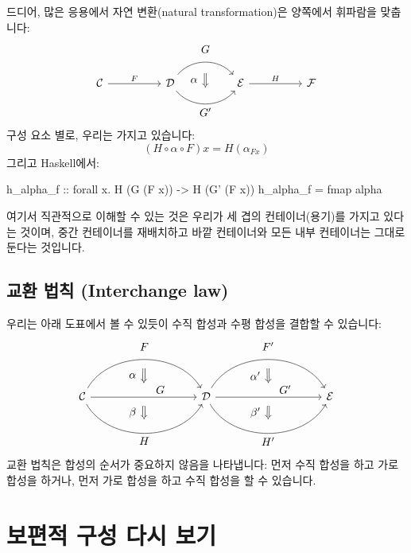 \documentclass[DaoFP]{subfiles}
\begin{document}
드디어, 많은 응용에서 자연 변환(natural transformation)은 양쪽에서 휘파람을 맞춥니다:
\[
\begin{tikzcd}[column sep=huge]
\mathcal{C}
 \arrow[r, "F"]
 &
\mathcal{D}
  \arrow[bend left=50]{r}[name=U1, label=above:$G$]{}
  \arrow[bend right=50]{r}[name=D1, label=below:$G'$]{} 
 &
\mathcal{E}
  \arrow[shorten <=10pt,shorten >=10pt,Rightarrow,to path={(U1) -- node[label=left:$\alpha$] {} (D1)}]{}
  \arrow[r, "H"]
 &
 \mathcal{F}
\end{tikzcd}
\]
구성 요소 별로, 우리는 가지고 있습니다:
\[ (H \circ \alpha \circ F) x = H (\alpha_{F x})\]
그리고 Haskell에서:
\begin{haskell}
h_alpha_f :: forall x. H (G (F x)) -> H (G' (F x))
h_alpha_f = fmap alpha
\end{haskell}

여기서 직관적으로 이해할 수 있는 것은 우리가 세 겹의 컨테이너(용기)를 가지고 있다는 것이며, 중간 컨테이너를 재배치하고 바깥 컨테이너와 모든 내부 컨테이너는 그대로 둔다는 것입니다.

\subsection{교환 법칙 (Interchange law)}

우리는 아래 도표에서 볼 수 있듯이 수직 합성과 수평 합성을 결합할 수 있습니다:
\[
\begin{tikzcd}[column sep=huge]
\mathcal{C}
  \arrow[bend left=60]{rr}[name=U, label=above:$F$]{}
  \arrow[]{rr}[name=M, label={[xshift=15pt, yshift=-5pt]:$G$}]{} 
  \arrow[bend right=60]{rr}[name=D, label=below:$H$]{} 
 &&
\mathcal{D}
  \arrow[bend left=60]{rr}[name=U1, label=above:$F'$]{}
  \arrow[]{rr}[name=M1, label={[xshift=15pt, yshift=-5pt]:$G'$}]{} 
  \arrow[bend right=60]{rr}[name=D1, label=below:$H'$]{} 
&&
\mathcal{E}
  \arrow[shorten <=8pt, shorten >=8pt,Rightarrow, to path={(U) -- node[label=left:$\alpha$] {} (M)}]{}
  \arrow[shorten <=8pt, shorten >=8pt,Rightarrow, to path={(M) -- node[label=left:$\beta$] {} (D)}]{}
  \arrow[shorten <=8pt, shorten >=8pt,Rightarrow, to path={(U1) -- node[label=left:$\alpha'$] {} (M1)}]{}
  \arrow[shorten <=8pt, shorten >=8pt,Rightarrow, to path={(M1) -- node[label=left:$\beta'$] {} (D1)}]{}
\end{tikzcd}
\]
교환 법칙은 합성의 순서가 중요하지 않음을 나타냅니다: 먼저 수직 합성을 하고 가로 합성을 하거나, 먼저 가로 합성을 하고 수직 합성을 할 수 있습니다.


\section{보편적 구성 다시 보기}
\end{document}
